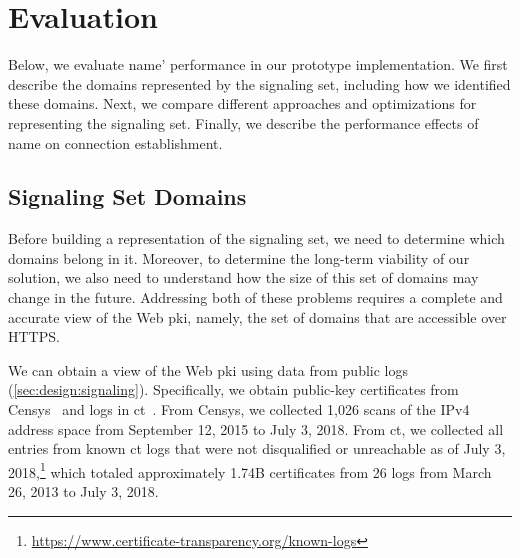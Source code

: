 \section{Evaluation}
\label{sec:evaluation}

Below, we evaluate \ac{name}' performance in our prototype implementation.
We first describe the domains represented by the signaling set,
including how we identified these domains. Next, we compare different approaches
and optimizations for representing the signaling set. Finally, we describe the
performance effects of \ac{name} on connection establishment.

\subsection{Signaling Set Domains}
\label{sec:evaluation:https}

Before building a representation of the signaling set, we need to determine
which domains belong in it. Moreover, to determine the long-term
viability of our solution, we also need to understand how the size of this set
of domains may change in the future. Addressing both of these problems requires
a complete and accurate view of the Web \ac{pki}, namely, the set of domains
that are accessible over HTTPS.

We can obtain a view of the Web \ac{pki} using data from public logs (\autoref{sec:design:signaling}). 
Specifically, we obtain public-key
certificates from Censys~\cite{durumeric2015search} and logs in
\ac{ct}~\cite{rfc6962}. From Censys, we collected 1,026 scans of the IPv4
address space from September 12, 2015 to July 3, 2018.
From \ac{ct}, we collected all entries from known \ac{ct} logs that were not
disqualified or unreachable as of July 3,
2018,\footnote{\url{https://www.certificate-transparency.org/known-logs}} which
totaled approximately 1.74B certificates from 26 logs from
March 26, 2013 to July 3, 2018.


